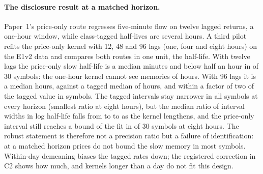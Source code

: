 \paragraph{The disclosure result at a matched horizon.} Paper~1's price-only route regresses five-minute flow on twelve lagged returns, a one-hour window, while class-tagged half-lives are several hours. A third pilot refits the price-only kernel with 12, 48 and 96 lags (one, four and eight hours) on the E1v2 data and compares both routes in one unit, the half-life. With twelve lags the price-only slow half-life is a median \PthreeHLtwelve{} minutes and below half an hour in \PthreeShortTwelve{} of 30 symbols: the one-hour kernel cannot see memories of hours. With 96 lags it is a median \PthreeHLninetysix{} hours, against a tagged median of \PthreeTagHL{} hours, and within a factor of two of the tagged value in \PthreeNearninetysix{} symbols. The tagged intervals stay narrower in all \PthreeTighter{} symbols at every horizon (smallest ratio \PthreeMinRatio{} at eight hours), but the median ratio of interval widths in log half-life falls from \PthreeRatioTwelve{} to \PthreeRatioFortyeight{} to \PthreeRatioNinetysix{} as the kernel lengthens, and the price-only interval still reaches a bound of the fit in \PthreeBoundNinetysix{} of 30 symbols at eight hours. The robust statement is therefore not a precision ratio but a failure of identification: at a matched horizon prices do not bound the slow memory in most symbols. Within-day demeaning biases the tagged rates down; the registered correction in C2 shows how much, and kernels longer than a day do not fit this design.

